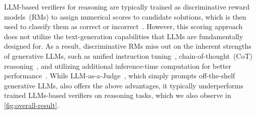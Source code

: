 \documentclass[11pt, letterpaper, logo, copyright]{googledeepmind}
\begin{document}
LLM-based verifiers for reasoning are typically trained as discriminative reward models~(RMs) to assign numerical scores to candidate solutions, which is then used to classify them as correct or incorrect~\citep{cobbe2021training, lightman2023let, wang2023math}. However, this scoring approach does not utilize the text-generation capabilities that LLMs are fundamentally designed for. 
As a result, discriminative RMs miss out on the inherent strengths of generative LLMs, such as unified instruction tuning~\citep{chung2024scaling}, chain-of-thought~(CoT) reasoning~\citep{wei2022chain}, and utilizing additional inference-time computation for better performance~\citep{ wang2022self, brown2024large}. While LLM-as-a-Judge~\citep{zheng2024judging}, which simply prompts off-the-shelf generative LLMs, also offers the above advantages, it typically underperforms trained LLMs-based verifiers on reasoning tasks, which we also observe in \autoref{fig:overall-result}.
\end{document}
